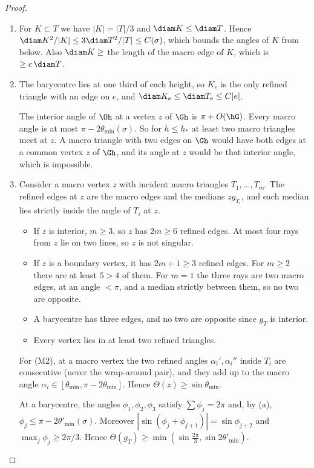 \begin{proof}
\begin{enumerate}[label=(\alph*)]
\item For $K\subset T$ we have $|K|=|T|/3$ and $\diam K\le\diam T$. Hence $\diam K^2/|K|\le3\diam T^2/|T|\le C(\sigma)$, which bounds the angles of $K$ from below. Also $\diam K\ge$ the length of the macro edge of $K$, which is $\ge c\,\diam T$.
\item The barycentre lies at one third of each height, so $K_e$ is the only refined triangle with an edge on $e$, and $\diam K_e\le\diam T_e\le C|e|$.

The interior angle of $\Oh$ at a vertex $z$ of $\Gh$ is $\pi+O(\hG)$. Every macro angle is at most $\pi-2\theta_{\min}(\sigma)$. So for $h\le h_\ast$ at least two macro triangles meet at $z$. A macro triangle with two edges on $\Gh$ would have both edges at a common vertex $z$ of $\Gh$, and its angle at $z$ would be that interior angle, which is impossible.
\item Consider a macro vertex $z$ with incident macro triangles $T_1,\dots,T_m$. The refined edges at $z$ are the macro edges and the medians $zg_{T_i}$, and each median lies strictly inside the angle of $T_i$ at $z$.
\begin{itemize}
\item If $z$ is interior, $m\ge3$, so $z$ has $2m\ge6$ refined edges. At most four rays from $z$ lie on two lines, so $z$ is not singular.
\item If $z$ is a boundary vertex, it has $2m+1\ge3$ refined edges. For $m\ge2$ there are at least $5>4$ of them. For $m=1$ the three rays are two macro edges, at an angle $<\pi$, and a median strictly between them, so no two are opposite.
\item A barycentre has three edges, and no two are opposite since $g_T$ is interior.
\item Every vertex lies in at least two refined triangles.
\end{itemize}
For (M2), at a macro vertex the two refined angles $\alpha_i',\alpha_i''$ inside $T_i$ are consecutive (never the wrap-around pair), and they add up to the macro angle $\alpha_i\in[\theta_{\min},\pi-2\theta_{\min}]$. Hence $\Theta(z)\ge\sin\theta_{\min}$.

At a barycentre, the angles $\phi_1,\phi_2,\phi_3$ satisfy $\sum\phi_j=2\pi$ and, by (a), $\phi_j\le\pi-2\theta'_{\min}(\sigma)$. Moreover $|\sin(\phi_j+\phi_{j+1})|=\sin\phi_{j+2}$ and $\max_j\phi_j\ge2\pi/3$. Hence $\Theta(g_T)\ge\min(\sin\tfrac{2\pi}3,\sin2\theta'_{\min})$.\qedhere
\end{enumerate}
\end{proof}

